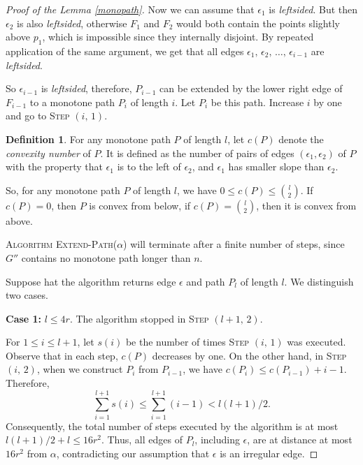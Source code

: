 \documentclass[12pt]{article}
\theoremstyle{plain}
\theoremstyle{definition}
\newtheorem{definition}{Definition}
\theoremstyle{remark}
\begin{document}
\begin{proof}[Proof of the Lemma \ref{monopath}]
Now we can assume that $\epsilon_1$ is \emph{leftsided}. 
But then $\epsilon_2$ is also \emph{leftsided}, otherwise 
$F_1$ and $F_2$ would both contain the points slightly above $p_1$, which is impossible since they
internally disjoint. By repeated application of the same argument, we get that all edges 
$\epsilon_1, \, \epsilon_2, \, \ldots, \, \epsilon_{i-1}$ are \emph{leftsided}.

So $\epsilon_{i-1}$ is 
\emph{leftsided},
therefore, $P_{i-1}$ can be extended by the lower right  
edge of $F_{i-1}$ to a monotone path $P_i$ 
of length $i$. Let  
$P_{i}$ be this path. 
Increase $i$  by one and go to \textsc{Step $(i, \, 1)$}.


\bigskip


\begin{definition}
For any monotone path $P$ of 
length $l$, let $c(P)$ denote the \emph{convexity number} of $P$.
It is defined as the number of pairs of edges 
$(\epsilon_1, \epsilon_2)$ of $P$ with the property that 
$\epsilon_1$ is to the left of $\epsilon_2$, and $\epsilon_1$ has smaller slope than $\epsilon_2$.
\end{definition} 

\smallskip

So, for any monotone path $P$ of length $l$, we have
$0\le c(P)\le \binom{l}{2}$. If 
$c(P)=0$, then $P$ is convex from below, if 
$c(P)=\binom{l}{2}$, then 
it is convex from above.

\textsc{Algorithm Extend-Path($\alpha$)}
will terminate after a finite number of steps, since $G''$ contains no monotone path longer than $n$.

Suppose hat the algorithm returns edge $\epsilon$ and path $P_l$ of length $l$.
We distinguish two cases. 

\smallskip

\noindent \textbf{Case 1:} $l\le 4r$.
The algorithm stopped in \textsc{Step $(l+1, \, 2)$}.  

For 
$1\le i\le l+1$, let $s(i)$ be the number of 
times 
\textsc{Step $(i,  \, 1)$} 
was executed. 
Observe that in each step, $c(P)$ decreases by one.
On the other hand, in \textsc{Step $(i,  \, 2)$}, when we construct 
$P_i$ from $P_{i-1}$, we have $c(P_i)\le c(P_{i-1})+i-1.$
Therefore, $$\sum_{i=1}^{l+1}s(i)\le \sum_{i=1}^{l+1}(i-1)<l(l+1)/2.$$ 
Consequently, the total number of steps executed by the algorithm is at most $l(l+1)/2+l\le 16r^2$. 
Thus, 
all edges of $P_{l}$, including $\epsilon$, are  
at distance at most $16r^2$ from $\alpha$, contradicting our assumption that $\epsilon$ is an irregular edge. 


\end{proof}
\end{document}
